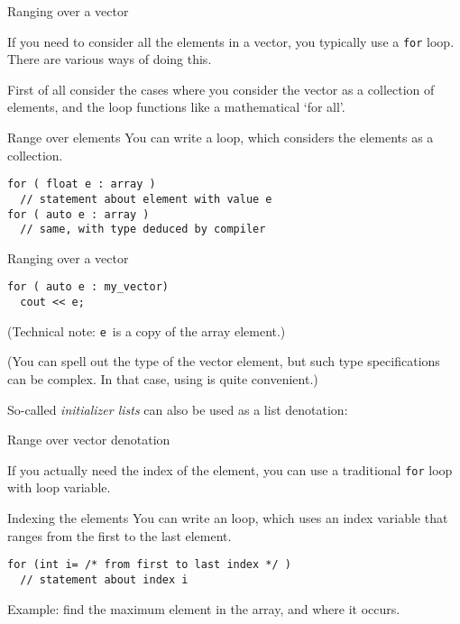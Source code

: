  {Ranging over a vector}
\label{sec:arrayrange}

If you need to consider all the elements in a vector, you typically
use a \lstinline{for} loop. There are various ways of doing this.

First of all consider the cases where you consider the vector as a
collection of elements, and the loop functions like a mathematical
`for all'.

\begin{block}{Range over elements}
  \label{sl:array-range}
  You can write a  loop, which
  considers the elements as a collection.
\begin{lstlisting}
for ( float e : array )
  // statement about element with value e
for ( auto e : array )
  // same, with type deduced by compiler
\end{lstlisting}

\end{block}

\begin{block}{Ranging over a vector}
  \label{sl:vector-range}
\begin{lstlisting}
for ( auto e : my_vector)
  cout << e;
\end{lstlisting}
(Technical note: \lstinline{e}~is a copy of the array element.)
\end{block}

(You can spell out the type of the vector element, but such type
specifications can be complex. In that case, using  is
quite convenient.)

So-called \emph{initializer lists}
can also be used as a list denotation:

\begin{block}{Range over vector denotation}
  \label{sl:range-denote}
\end{block}

If you actually need the index of the element, you can use a
traditional \lstinline{for} loop with loop variable.

\begin{block}{Indexing the elements}
  \label{sl:index-range}
  You can write an  loop, which uses an
  index variable that ranges from the first to the last element.
\begin{lstlisting}
for (int i= /* from first to last index */ )
  // statement about index i
\end{lstlisting}
Example: find the maximum element in the array, and where it occurs.
%
\end{block}

